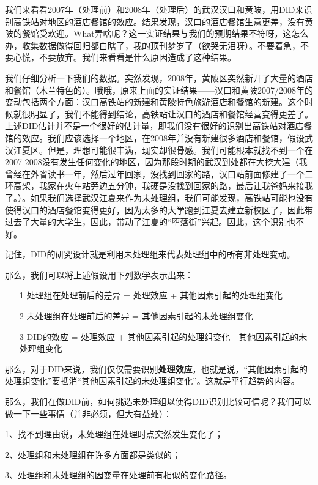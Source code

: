 \documentclass[cn,12pt,math=newtx,citestyle=gb7714-2015,bibstyle=gb7714-2015]{elegantbook}
\begin{document}
	我们来看看2007年（处理前）和2008年（处理后）的武汉汉口和黄陂，用DID来识别高铁站对地区的酒店餐馆的效应。结果发现，汉口的酒店餐馆生意更差，没有黄陂的餐馆受欢迎。What弄啥呢？这一实证结果与我们的预期结果不符呀，这怎么办，收集数据做得回归都白瞎了，我的顶刊梦岁了（欲哭无泪呀）。不要着急，不要心慌，不要放弃。我们来看看是什么原因造成了这种结果。
	
	我们仔细分析一下我们的数据。突然发现，2008年，黄陂区突然新开了大量的酒店和餐馆（木兰特色的）。哦哦，原来上面的实证结果——汉口和黄陂2007/2008年的变动包括两个方面：汉口高铁站的新建和黄陂特色旅游酒店和餐馆的新建。这个时候就很明显了，我们不能得到结论，高铁站让汉口的酒店和餐馆经营变得更差了。上述DID估计并不是一个很好的估计量，即我们没有很好的识别出高铁站对酒店餐馆的效应。我们应该选择一个地区，在2008年并没有新建很多酒店和餐馆，假设武汉江夏区。但是，理想可能很丰满，现实却很骨感。我们可能根本就找不到一个在2007-2008没有发生任何变化的地区，因为那段时期的武汉到处都在大挖大建（我曾经在外省读书一年，然后过年回家，没找到回家的路，汉口站前面修建了一个二环高架，我家在火车站旁边五分钟，我硬是没找到回家的路，最后让我爸妈来接我了。）。如果我们选择武汉江夏来作为未处理组，我们可能发现，高铁站可能也没有使得汉口的酒店餐馆变得更好，因为太多的大学跑到江夏去建立新校区了，因此带过去了大量的大学生，因此，带动了江夏的“堕落街”兴起。因此，这个识别也不好。
	
	记住，DID的研究设计就是利用未处理组来代表处理组中的所有非处理变动。
	
	那么，我们可以将上述假设用下列数学表示出来：
	
	\begin{itemize}
		\item [1] 处理组在处理前后的差异 = 处理效应 + 其他因素引起的处理组变化
		\item [2] 未处理组在处理前后的差异 = 其他因素引起的未处理组变化
		\item [3] DID的效应 = 处理效应 + 其他因素引起的处理组变化 - 其他因素引起的未处理组变化
	\end{itemize}
	
	那么，对于DID来说，我们仅仅需要识别\textbf{处理效应}，也就是说，“其他因素引起的处理组变化”要抵消“其他因素引起的未处理组变化”。这就是平行趋势的内容。
	
	那么，我们在做DID前，如何挑选未处理组以使得DID识别比较可信呢？我们可以做一下一些事情（并非必须，但大有益处）：
	
	1、找不到理由说，未处理组在处理时点突然发生变化了；
	
	2、处理组和未处理组在许多方面都是类似的；
	
	3、处理组和未处理组的因变量在处理前有相似的变化路径。
	
\end{document}

